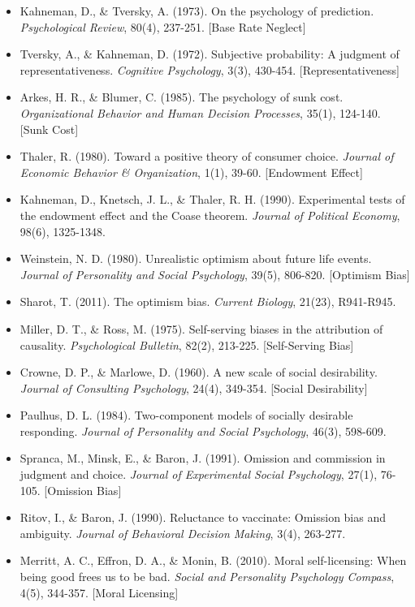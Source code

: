 \begin{itemize}[leftmargin=*]
    \item Kahneman, D., \& Tversky, A. (1973). On the psychology of prediction. \textit{Psychological Review}, 80(4), 237-251. [Base Rate Neglect]
    \item Tversky, A., \& Kahneman, D. (1972). Subjective probability: A judgment of representativeness. \textit{Cognitive Psychology}, 3(3), 430-454. [Representativeness]
    \item Arkes, H. R., \& Blumer, C. (1985). The psychology of sunk cost. \textit{Organizational Behavior and Human Decision Processes}, 35(1), 124-140. [Sunk Cost]
    \item Thaler, R. (1980). Toward a positive theory of consumer choice. \textit{Journal of Economic Behavior \& Organization}, 1(1), 39-60. [Endowment Effect]
    \item Kahneman, D., Knetsch, J. L., \& Thaler, R. H. (1990). Experimental tests of the endowment effect and the Coase theorem. \textit{Journal of Political Economy}, 98(6), 1325-1348.
    \item Weinstein, N. D. (1980). Unrealistic optimism about future life events. \textit{Journal of Personality and Social Psychology}, 39(5), 806-820. [Optimism Bias]
    \item Sharot, T. (2011). The optimism bias. \textit{Current Biology}, 21(23), R941-R945.
    \item Miller, D. T., \& Ross, M. (1975). Self-serving biases in the attribution of causality. \textit{Psychological Bulletin}, 82(2), 213-225. [Self-Serving Bias]
    \item Crowne, D. P., \& Marlowe, D. (1960). A new scale of social desirability. \textit{Journal of Consulting Psychology}, 24(4), 349-354. [Social Desirability]
    \item Paulhus, D. L. (1984). Two-component models of socially desirable responding. \textit{Journal of Personality and Social Psychology}, 46(3), 598-609.
    \item Spranca, M., Minsk, E., \& Baron, J. (1991). Omission and commission in judgment and choice. \textit{Journal of Experimental Social Psychology}, 27(1), 76-105. [Omission Bias]
    \item Ritov, I., \& Baron, J. (1990). Reluctance to vaccinate: Omission bias and ambiguity. \textit{Journal of Behavioral Decision Making}, 3(4), 263-277.
    \item Merritt, A. C., Effron, D. A., \& Monin, B. (2010). Moral self-licensing: When being good frees us to be bad. \textit{Social and Personality Psychology Compass}, 4(5), 344-357. [Moral Licensing]

\end{itemize}
